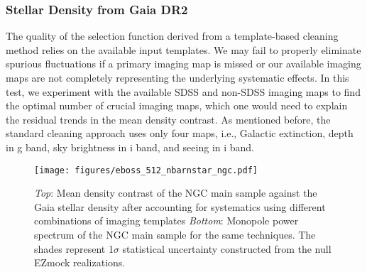 \subsubsection{Stellar Density from Gaia DR2}\label{subsec:nstar}
The quality of the selection function derived from a template-based cleaning method relies on the available input templates. We may fail to properly eliminate spurious fluctuations if a primary imaging map is missed or our available imaging maps are not completely representing the underlying systematic effects. In this test, we experiment with the available SDSS and non-SDSS imaging maps to find the optimal number of crucial imaging maps, which one would need to explain the residual trends in the mean density contrast. As mentioned before, the standard cleaning approach uses only four maps, i.e., Galactic extinction, depth in g band, sky brightness in i band, and seeing in i band.


\begin{figure}
    \centering
    \texttt{[image: figures/eboss\_512\_nbarnstar\_ngc.pdf]}
    \caption[Mean density and power spectrum of eBOSS quasars for different templates.]{\textit{Top}: Mean density contrast of the NGC main sample against the Gaia stellar density after accounting for systematics using different combinations of imaging templates \textit{Bottom}: Monopole power spectrum of the NGC main sample for the same techniques. The shades represent 1$\sigma$ statistical uncertainty constructed from the null EZmock realizations.}
    \label{fig:nbarnstar}
\end{figure}


